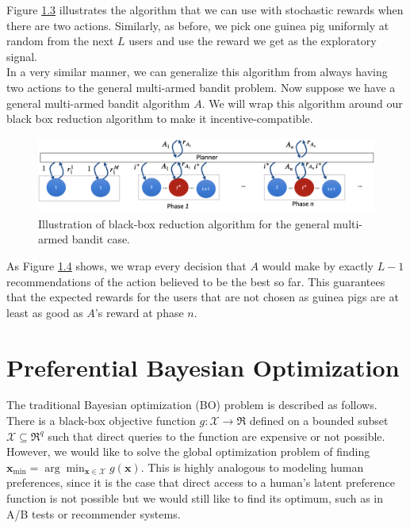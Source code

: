 \documentclass[
  letterpaper,
  DIV=11,
  numbers=noendperiod,
  oneside]{scrreprt}
\theoremstyle{remark}
\begin{document}
Figure \hyperref[fig:stochastic-guinea-pig]{1.3} illustrates the
algorithm that we can use with stochastic rewards when there are two
actions. Similarly, as before, we pick one guinea pig uniformly at
random from the next \(L\) users and use the reward we get as the
exploratory signal.\\
In a very similar manner, we can generalize this algorithm from always
having two actions to the general multi-armed bandit problem. Now
suppose we have a general multi-armed bandit algorithm \(A\). We will
wrap this algorithm around our black box reduction algorithm to make it
incentive-compatible.

\begin{figure}

{\centering \includegraphics{Figures/multi-armed-guinea-pig.png}

}

\caption{Illustration of black-box reduction algorithm for the general
multi-armed bandit case.}

\end{figure}%

As Figure \hyperref[fig:multi-armed-guinea-pig]{1.4} shows, we wrap
every decision that \(A\) would make by exactly \(L-1\) recommendations
of the action believed to be the best so far. This guarantees that the
expected rewards for the users that are not chosen as guinea pigs are at
least as good as \(A\)'s reward at phase \(n\).

\section{Preferential Bayesian
Optimization}\label{preferential-bayesian-optimization}

The traditional Bayesian optimization (BO) problem is described as
follows. There is a black-box objective function
\(g: \mathcal{X} \rightarrow \Re\) defined on a bounded subset
\(\mathcal{X} \subseteq \Re^q\) such that direct queries to the function
are expensive or not possible. However, we would like to solve the
global optimization problem of finding
\(\mathbf{x}_{\min }=\arg \min _{\mathbf{x} \in \mathcal{X}} g(\mathbf{x})\).
This is highly analogous to modeling human preferences, since it is the
case that direct access to a human's latent preference function is not
possible but we would still like to find its optimum, such as in A/B
tests or recommender systems.
\end{document}
